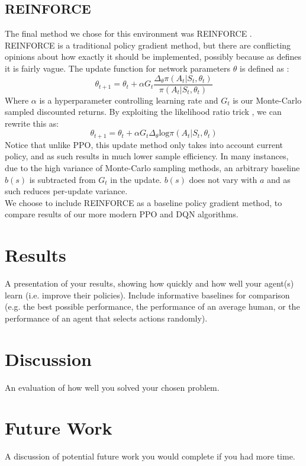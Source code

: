 \documentclass{article}
\begin{document}
\subsection{REINFORCE}
The final method we chose for this environment was REINFORCE \citep{williams1992simple}. REINFORCE is a traditional policy gradient method, but there are conflicting opinions about how exactly it should be implemented, possibly because as \citet{williams1992simple} defines it is fairly vague. The update function for network parameters $\theta$ is defined as \citep{10.5555/3312046}:
\begin{equation}
\theta_{t+1} = \theta_{t} + \alpha G_t\frac{\Delta_\theta\pi(A_t| S_t, \theta_t)}{\pi(A_t| S_t, \theta_t)}
\end{equation}
Where $\alpha$ is a hyperparameter controlling learning rate and $G_t$ is our Monte-Carlo sampled discounted returns. By exploiting the likelihood ratio trick \citep{silver2015}, we can rewrite this as:
\begin{equation}
  \theta_{t+1} = \theta_{t} + \alpha G_t\Delta_\theta \text{log} \pi(A_t | S_t, \theta_t)
\end{equation}
Notice that unlike PPO, this update method only takes into account current policy, and as such results in much lower sample efficiency. In many instances, due to the high variance of Monte-Carlo sampling methods, an arbitrary baseline $b(s)$ is subtracted from $G_t$ in the update. $b(s)$ does not vary with $a$ and as such reduces per-update variance. \\\newline
We choose to include REINFORCE as a baseline policy gradient method, to compare results of our more modern PPO and DQN algorithms.
\section{Results}
A presentation of your results, showing how quickly and how well your agent(s)
learn (i.e. improve their policies). Include informative baselines for comparison (e.g. the best
possible performance, the performance of an average human, or the performance of an agent
that selects actions randomly).

\section{Discussion}
An evaluation of how well you solved your chosen problem.

\section{Future Work}
A discussion of potential future work you would complete if you had more
time.
\end{document}
